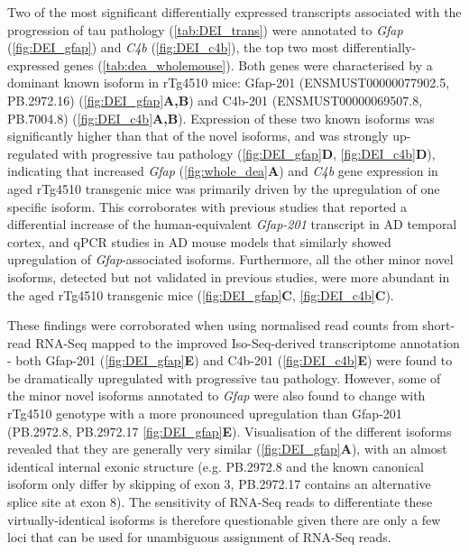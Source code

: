 Two of the most significant differentially expressed transcripts associated with the progression of tau pathology (\cref{tab:DEI_trans}) were annotated to \textit{Gfap} (\cref{fig:DEI_gfap}) and \textit{C4b} (\cref{fig:DEI_c4b}), the top two most differentially-expressed genes (\cref{tab:dea_wholemouse}). Both genes were characterised by a dominant known isoform in rTg4510 mice: Gfap-201 (ENSMUST00000077902.5, PB.2972.16) (\cref{fig:DEI_gfap}\textbf{A,B}) and C4b-201 (ENSMUST00000069507.8, PB.7004.8) (\cref{fig:DEI_c4b}\textbf{A,B}). Expression of these two known isoforms was significantly higher than that of the novel isoforms, and was strongly up-regulated with progressive tau pathology (\cref{fig:DEI_gfap}\textbf{D}, \cref{fig:DEI_c4b}\textbf{D}), indicating that increased \textit{Gfap} (\cref{fig:whole_dea}\textbf{A}) and \textit{C4b} gene expression in aged rTg4510 transgenic mice was primarily driven by the upregulation of one specific isoform. This corroborates with previous studies that reported a differential increase of the human-equivalent \textit{Gfap-201} transcript in AD temporal cortex\cite{Roelofs2005}, and qPCR studies in AD mouse models that similarly showed upregulation of \textit{Gfap}-associated isoforms\cite{Kamphuis2012}. Furthermore, all the other minor novel isoforms, detected but not validated in previous studies\cite{Kamphuis2012}, were more abundant in the aged rTg4510 transgenic mice (\cref{fig:DEI_gfap}\textbf{C}, \cref{fig:DEI_c4b}\textbf{C}).

These findings were corroborated when using normalised read counts from short-read RNA-Seq mapped to the improved Iso-Seq-derived transcriptome annotation - both Gfap-201 (\cref{fig:DEI_gfap}\textbf{E}) and C4b-201 (\cref{fig:DEI_c4b}\textbf{E}) were found to be dramatically upregulated with progressive tau pathology. However, some of the minor novel isoforms annotated to \textit{Gfap} were also found to change with rTg4510 genotype with a more pronounced upregulation than Gfap-201 (PB.2972.8, PB.2972.17 \cref{fig:DEI_gfap}\textbf{E}). Visualisation of the different isoforms revealed that they are generally very similar (\cref{fig:DEI_gfap}\textbf{A}), with an almost identical internal exonic structure (e.g. PB.2972.8 and the known canonical isoform only differ by skipping of exon 3, PB.2972.17 contains an alternative splice site at exon 8). The sensitivity of RNA-Seq reads to differentiate these virtually-identical isoforms is therefore questionable given there are only a few loci that can be used for unambiguous assignment of RNA-Seq reads.  

